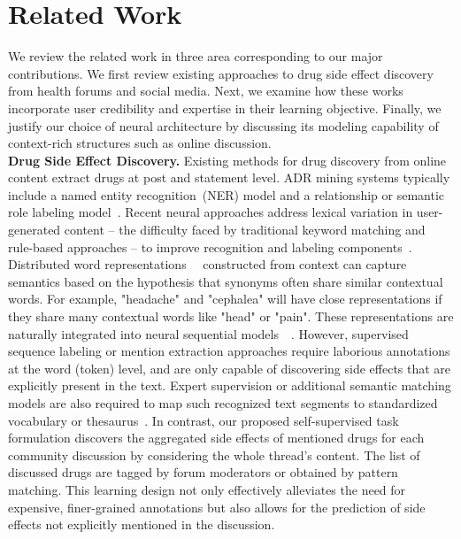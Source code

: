 \documentclass{bmcart}
\begin{document}
\section{Related Work}\label{sec:related_work}

We review the related work in three area corresponding to our major contributions. We first review existing approaches to drug side effect discovery from health forums and social media. Next, we examine how these works incorporate user credibility and expertise in their learning objective. Finally, we justify our choice of neural architecture by discussing its modeling capability of context-rich structures such as online discussion. \\

{\bf Drug Side Effect Discovery.} Existing methods for drug discovery from online content extract drugs at post and statement level. ADR mining systems typically include 
a named entity recognition~(NER) model and a relationship or semantic role labeling model~\cite{sampathkumar2014mining,liu2018patient}. 
Recent neural approaches address lexical variation in user-generated content -- the difficulty faced by traditional keyword matching and rule-based approaches -- to improve recognition and labeling components~\cite{ding2018attentive,wunnava2019adverse}. 
Distributed word representations~\cite{mikolov2013distributed}~\cite{pennington2014glove} constructed from context can capture semantics based on the hypothesis that synonyms often share similar contextual words. For example, "headache" and "cephalea" will have close representations if they share many contextual words like "head" or "pain". These representations are naturally integrated into neural sequential models~\cite{kim2014convolutional}~\cite{sutskever2014sequence}. 
However, supervised sequence labeling or mention extraction approaches require laborious annotations at the word (token) level, and are only capable of discovering side effects that are explicitly present in the text. Expert supervision or additional semantic matching models are also required to map such recognized text segments to standardized vocabulary or thesaurus~\cite{yates2015extracting}. In contrast, our proposed self-supervised task formulation discovers the aggregated side effects of mentioned drugs for each community discussion by considering the whole thread's content. The list of discussed drugs are tagged by forum moderators or obtained by pattern matching. This learning design not only effectively alleviates the need for expensive, finer-grained annotations but also allows for the prediction of side effects not explicitly mentioned in the discussion. \\
\end{document}
